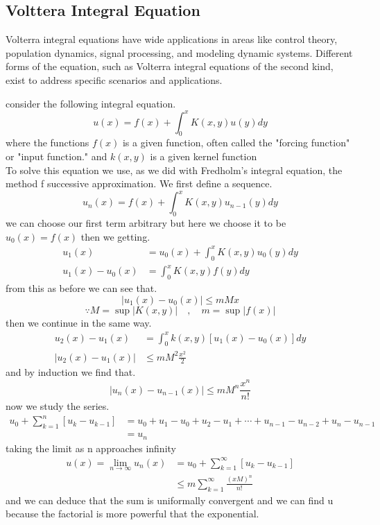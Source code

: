 \documentclass[]{article}
\begin{document}
\subsection{Volttera Integral Equation}
Volterra integral equations have wide applications in areas like control theory, population dynamics, signal processing, and modeling dynamic systems. Different forms of the equation, such as Volterra integral equations of the second kind, exist to address specific scenarios and applications.
\par 
consider the following  integral equation.
\[
u(x) = f(x) + \int_{0}^{x} K(x,y) u(y)dy
\]
where the functions $f(x)$ is a given function, often called the "forcing function" or "input function."
and $k(x,y)$ is a given kernel function
\\
To solve this equation we use, as we did with Fredholm's integral equation, the method f successive approximation. We first define a sequence.
\[
u_n(x) = f(x) + \int_{0}^{x} K(x,y) u_{n-1}(y)dy    
\]
we can choose our first term arbitrary but here we choose it to be $u_0(x) = f(x)$ then we getting.
\begin{align*}
u_1(x) &= u_0(x) + \int_{0}^{x} K(x,y) u_0(y)dy
\\
u_1(x) - u_0(x) &= \int_{0}^{x} K(x,y) f(y)dy
\end{align*}
from this as before we can see that.
\[
|u_1(x) - u_0(x)| \leq mMx
\]
\[
\because M=\sup|K(x,y)| \quad , \quad m=\sup |f(x)|        
\]
then we continue in the same way.
\begin{align*}
u_2(x) - u_1(x) &= \int_{0}^{x} k(x,y) [u_1(x) - u_0(x)] dy
\\
|u_2(x) - u_1(x)| &\leq mM^2\frac{x^2}{2}
\end{align*}
and by induction we find that.
\[
|u_n(x) - u_{n-1}(x)| \leq mM^n\frac{x^n}{n!}    
\]
now we study the series.
\begin{align*}
u_0 + \sum_{k=1}^{n} [u_k-u_{k-1}] &= u_0 + u_1 - u_0 +u_2 - u_1 + \cdots +u_{n-1}-u_{n-2}+ u_n - u_{n-1} 
\\
&= u_n
\end{align*}
taking the limit as n approaches infinity
\begin{align*}
u(x) = \lim_{n\to \infty} u_n(x) &= u_0 + \sum_{k=1}^{\infty} [u_k-u_{k-1}]    
\\
& \leq m\sum_{k=1}^{\infty} \frac{{(xM)}^n}{n!}
\end{align*}
and we can deduce that the sum is uniformally convergent and we can find u because the factorial is more powerful that the exponential.
\end{document}
